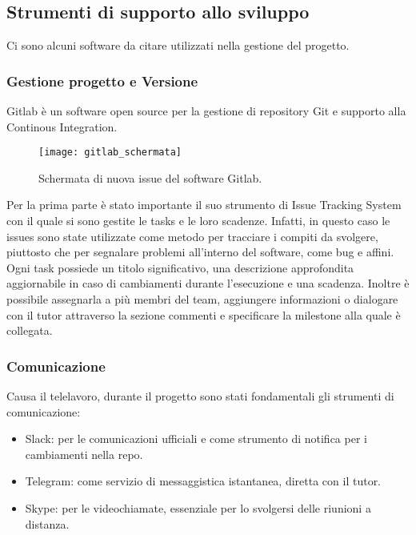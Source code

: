 \subsection{Strumenti di supporto allo sviluppo}
Ci sono alcuni software da citare utilizzati nella gestione del progetto.

\subsubsection{Gestione progetto e Versione}
Gitlab è un software open source per la gestione di repository \gls{Git} e supporto alla Continous Integration.

\begin{figure}[htbp]
	\begin{center}
		\texttt{[image: gitlab\_schermata]}
	\end{center}
	\caption {Schermata di nuova issue del software Gitlab.}
\end{figure}

\noindent Per la prima parte è stato importante il suo strumento di \gls{Issue Tracking System} con il quale si sono gestite le tasks e le loro scadenze.
Infatti, in questo caso le issues sono state utilizzate come metodo per tracciare i compiti da svolgere, piuttosto che per segnalare problemi all'interno del software, come bug e affini. \\
\noindent Ogni task possiede un titolo significativo, una descrizione approfondita aggiornabile in caso di cambiamenti durante l'esecuzione e una scadenza. Inoltre è possibile assegnarla a più membri del team, aggiungere informazioni o dialogare con il tutor attraverso la sezione commenti e specificare la milestone alla quale è collegata.

\subsubsection{Comunicazione}
Causa il telelavoro, durante il progetto sono stati fondamentali gli strumenti di comunicazione:
\begin{itemize}
  \item Slack: per le comunicazioni ufficiali e come strumento di notifica per i cambiamenti nella repo.
  \item Telegram: come servizio di messaggistica istantanea, diretta con il tutor.
	\item Skype: per le videochiamate, essenziale per lo svolgersi delle riunioni a distanza.
\end{itemize}


